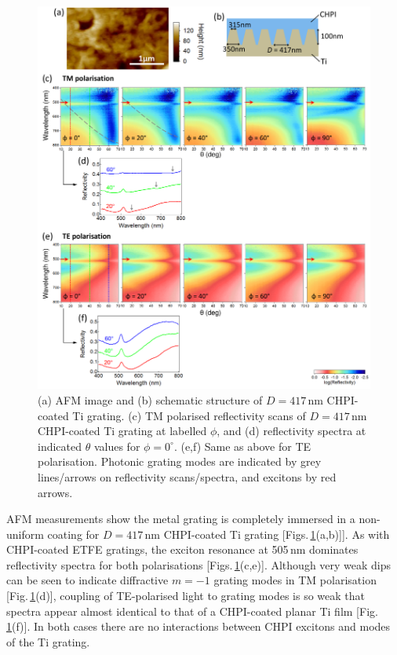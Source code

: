 \begin{figure}[h!] 
\centering    
\includegraphics[width=\textwidth]{Fig6}
\caption[(a) AFM image and (b) schematic structure of $D=417$\,nm CHPI-coated Ti grating. Reflectivity measurements of CHPI-coated Ti grating in (c,d) TM and (e.f) TE polarisation.]{(a) AFM image and (b) schematic structure of $D=417$\,nm CHPI-coated Ti grating. (c) TM polarised reflectivity scans of $D=417$\,nm CHPI-coated Ti grating at labelled $\phi$, and (d) reflectivity spectra at indicated $\theta$ values for $\phi=0^{\circ}$. (e,f) Same as above for TE polarisation. Photonic grating modes are indicated by grey lines/arrows on reflectivity scans/spectra, and excitons by red arrows.}
\label{7Fig6}
\end{figure}
AFM measurements show the metal grating is completely immersed in a non-uniform coating for $D=417$\,nm CHPI-coated Ti grating [Figs.\,\ref{7Fig6}(a,b)]]. As with CHPI-coated ETFE gratings, the exciton resonance at 505\,nm dominates reflectivity spectra for both polarisations [Figs.\,\ref{7Fig6}(c,e)]. Although very weak dips can be seen to indicate diffractive $m=-1$ grating modes in TM polarisation [Fig.\,\ref{7Fig6}(d)], coupling of TE-polarised light to grating modes is so weak that spectra appear almost identical to that of a CHPI-coated planar Ti film [Fig.\,\ref{7Fig6}(f)]. In both cases there are no interactions between CHPI excitons and modes of the Ti grating.

